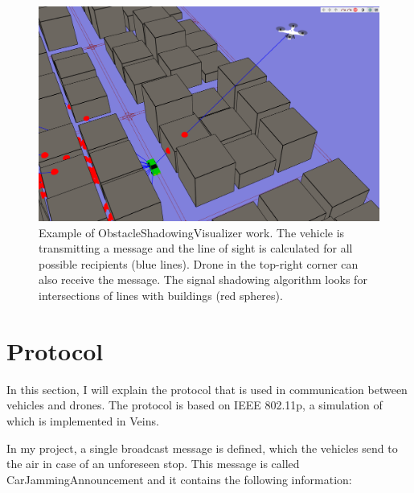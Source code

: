\documentclass[]{nsm-thesis}
\begin{document}
\begin{figure}
	\centering
	\includegraphics[width=1\textwidth]{figures/ObstacleShadowingVisualizer.png}
	\caption{Example of ObstacleShadowingVisualizer work. The vehicle is transmitting a message and the line of sight is calculated for all possible recipients (blue lines). Drone in the top-right corner can also receive the message. The signal shadowing algorithm looks for intersections of lines with buildings (red spheres).}
	\label{fig:ObstacleShadowingVisualizer}
\end{figure}



\section{Protocol}

In this section, I will explain the protocol that is used in communication between vehicles and drones. The protocol is based on IEEE 802.11p, a simulation of which is implemented in Veins. 

In my project, a single broadcast message is defined, which the vehicles send to the air in case of an unforeseen stop. This message is called CarJammingAnnouncement and it contains the following information:
\end{document}
